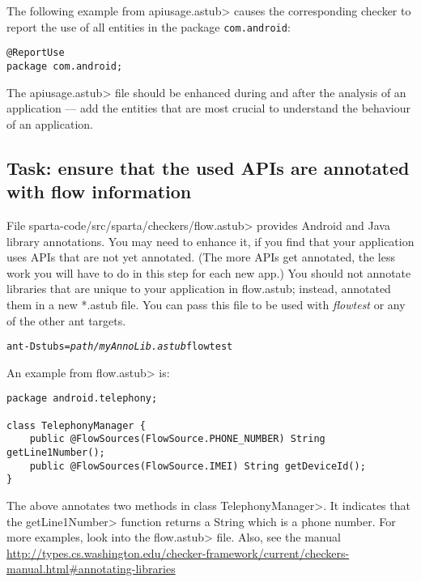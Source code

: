 The following example from \<apiusage.astub> causes the corresponding 
checker to report the use of all entities in the package 
\verb|com.android|:

\begin{Verbatim}
@ReportUse                                                         
package com.android;
\end{Verbatim}

The \<apiusage.astub> file should be enhanced during and after the 
analysis of an application --- add the entities that are most crucial to
understand the behaviour of an application.



\subsection{Task: ensure that the used APIs are annotated with flow information\label{flow-task-annotate-apis}}

File \<sparta-code/src/sparta/checkers/flow.astub> provides Android and Java
library annotations.  You may need to enhance it, if you find that your application
uses APIs that are not yet annotated.
(The  more APIs get annotated, the less work you will have to do in this
step for each new app.) You should not annotate libraries that are unique to your application in flow.astub;
instead, annotated them in a new *.astub file. You can pass this file to be used with 
\emph{flowtest} or any of the other ant targets.

\begin{alltt}
ant -Dstubs=\emph{path/myAnnoLib.astub} flowtest
\end{alltt}



An example from \<flow.astub> is:

\begin{Verbatim}
package android.telephony;

class TelephonyManager {
    public @FlowSources(FlowSource.PHONE_NUMBER) String getLine1Number();
    public @FlowSources(FlowSource.IMEI) String getDeviceId();
}
\end{Verbatim}

\noindent
The above annotates two methods in class \<TelephonyManager>.
It indicates that the \<getLine1Number> function returns a String which is a
phone number.  For more examples, look into the \<flow.astub> file. Also, see 
the manual \url{http://types.cs.washington.edu/checker-framework/current/checkers-manual.html#annotating-libraries}

